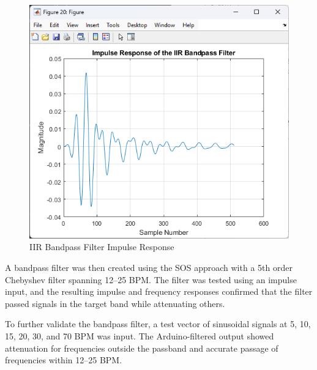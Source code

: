 \documentclass[journal]{IEEEtran}
\begin{document}
\begin{figure}[H]
    \centering
    \includegraphics[width=\linewidth]{BandpassSOSImpulse.png}
    \caption{IIR Bandpass Filter Impulse Response}
    \label{fig:band_pass_sos_impulse}
\end{figure}

A bandpass filter was then created using the SOS approach with a 5th order Chebyshev filter spanning 12–25 BPM. The filter was tested using an impulse input, and the resulting impulse and frequency responses confirmed that the filter passed signals in the target band while attenuating others.

To further validate the bandpass filter, a test vector of sinusoidal signals at 5, 10, 15, 20, 30, and 70 BPM was input. The Arduino-filtered output showed attenuation for frequencies outside the passband and accurate passage of frequencies within 12–25 BPM.
\end{document}
